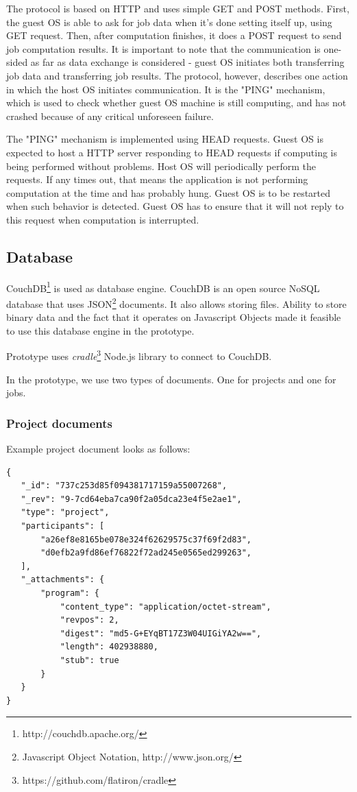 The protocol is based on HTTP and uses simple GET and POST methods. First, the guest OS is able to ask for job data when it's done setting itself up, using GET request. Then, after computation finishes, it does a POST request to send job computation results. It is important to note that the communication is one-sided as far as data exchange is considered - guest OS initiates both transferring job data and transferring job results. The protocol, however, describes one action in which the host OS initiates communication. It is the "PING" mechanism, which is used to check whether guest OS machine is still computing, and has not crashed because of any critical unforeseen failure. 

The "PING" mechanism is implemented using HEAD requests. Guest OS is expected to host a HTTP server responding to HEAD requests if computing is being performed without problems. Host OS will periodically perform the requests. If any times out, that means the application is not performing computation at the time and has probably hung. Guest OS is to be restarted when such behavior is detected. Guest OS has to ensure that it will not reply to this request when computation is interrupted.

\subsection{Database}

CouchDB\footnote{http://couchdb.apache.org/} is used as database engine. CouchDB is an open source NoSQL database that uses JSON\footnote{Javascript Object Notation, http://www.json.org/} documents. It also allows storing files. Ability to store binary data and the fact that it operates on Javascript Objects made it feasible to use this database engine in the prototype.

Prototype uses \emph{cradle}\footnote{https://github.com/flatiron/cradle} Node.js library to connect to CouchDB.

In the prototype, we use two types of documents. One for projects and one for jobs.

\subsubsection{Project documents}

Example project document looks as follows:

\begin{lstlisting}[caption=Project document in JSON format.]
{
   "_id": "737c253d85f094381717159a55007268",
   "_rev": "9-7cd64eba7ca90f2a05dca23e4f5e2ae1",
   "type": "project",
   "participants": [
       "a26ef8e8165be078e324f62629575c37f69f2d83",
       "d0efb2a9fd86ef76822f72ad245e0565ed299263",
   ],
   "_attachments": {
       "program": {
           "content_type": "application/octet-stream",
           "revpos": 2,
           "digest": "md5-G+EYqBT17Z3W04UIGiYA2w==",
           "length": 402938880,
           "stub": true
       }
   }
}
\end{lstlisting}

